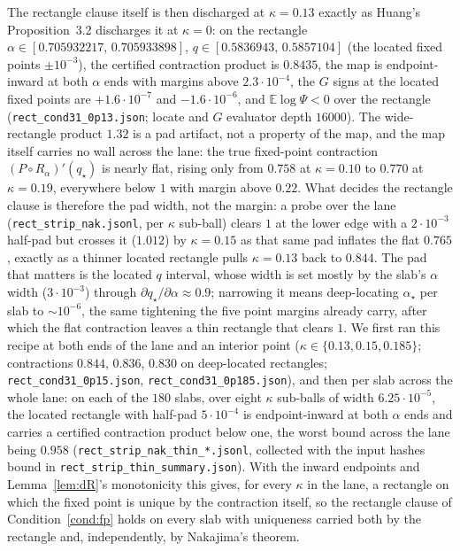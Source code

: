 \documentclass[11pt]{article}
\theoremstyle{remark}
\newcommand{\E}{\mathbb{E}}
\begin{document}
The rectangle clause itself is then discharged at $\kappa=0.13$
exactly as Huang's Proposition~3.2 discharges it at $\kappa=0$: on
the rectangle $\alpha\in[0.705932217,\,0.705933898]$,
$q\in[0.5836943,\,0.5857104]$ (the located fixed points
$\pm10^{-3}$), the certified contraction product is $0.8435$, the
map is endpoint-inward at both $\alpha$ ends with margins above
$2.3\cdot10^{-4}$, the $G$ signs at the located fixed points are
$+1.6\cdot10^{-7}$ and $-1.6\cdot10^{-6}$, and $\E\log\Psi<0$
over the rectangle (\texttt{rect\_cond31\_0p13.json}; locate and
$G$ evaluator depth $16000$).  The wide-rectangle product $1.32$ is a
pad artifact, not a property of the map, and the map itself carries
no wall across the lane: the true fixed-point contraction
$(P\circ R_\alpha)'(q_\star)$ is nearly flat, rising only from
$0.758$ at $\kappa=0.10$ to $0.770$ at $\kappa=0.19$, everywhere
below $1$ with margin above $0.22$.  What decides the rectangle
clause is therefore the pad width, not the margin: a probe over the
lane (\texttt{rect\_strip\_nak.jsonl}, per $\kappa$ sub-ball) clears
$1$ at the lower edge with a $2\cdot10^{-3}$ half-pad but crosses it
($1.012$) by $\kappa=0.15$ as that same pad inflates the flat
$0.765$, exactly as a thinner located rectangle pulls $\kappa=0.13$
back to $0.844$.  The pad that matters is the located $q$ interval,
whose width is set mostly by the slab's $\alpha$ width
($3\cdot10^{-3}$) through $\partial q_\star/\partial\alpha\approx0.9$;
narrowing it means deep-locating $\alpha_\star$ per slab to
$\sim10^{-6}$, the same tightening the five point margins already
carry, after which the flat contraction leaves a thin rectangle that
clears $1$.  We first ran this recipe at both ends of the lane and an interior
point ($\kappa\in\{0.13,0.15,0.185\}$; contractions $0.844$, $0.836$,
$0.830$ on deep-located rectangles;
\texttt{rect\_cond31\_0p15.json}, \texttt{rect\_cond31\_0p185.json}),
and then per slab across the whole lane: on each of the $180$ slabs,
over eight $\kappa$ sub-balls of width $6.25\cdot10^{-5}$, the
located rectangle with half-pad $5\cdot10^{-4}$ is endpoint-inward at
both $\alpha$ ends and carries a certified contraction product below
one, the worst bound across the lane being $0.958$
(\texttt{rect\_strip\_nak\_thin\_*.jsonl}, collected with the input
hashes bound in \texttt{rect\_strip\_thin\_summary.json}).  With the
inward endpoints and Lemma~\ref{lem:dR}'s monotonicity this gives,
for every $\kappa$ in the lane, a rectangle on which the fixed point
is unique by the contraction itself, so the rectangle clause of
Condition~\ref{cond:fp} holds on every slab with uniqueness carried
both by the rectangle and, independently, by Nakajima's theorem.
\end{document}
